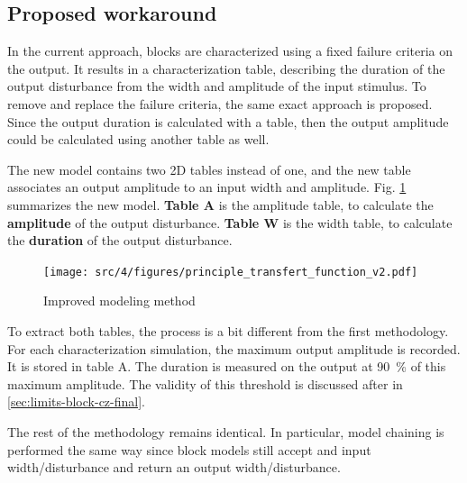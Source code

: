 \subsection{Proposed workaround}

%
In the current approach, blocks are characterized using a fixed failure criteria on the output.
It results in a characterization table, describing the duration of the output disturbance from the width and amplitude of the input stimulus.
To remove and replace the failure criteria, the same exact approach is proposed.
Since the output duration is calculated with a table, then the output amplitude could be calculated using another table as well.

The new model contains two 2D tables instead of one, and the new table associates an output amplitude to an input width and amplitude.
Fig. \ref{fig:principle-transfert-func-v2} summarizes the new model.
\textbf{Table A} is the amplitude table, to calculate the \textbf{amplitude} of the output disturbance.
\textbf{Table W} is the width table, to calculate the \textbf{duration} of the output disturbance.

\begin{figure}[!h]
  \centering
  \texttt{[image: src/4/figures/principle\_transfert\_function\_v2.pdf]}
  \caption{Improved modeling method}
  \label{fig:principle-transfert-func-v2}
\end{figure}

To extract both tables, the process is a bit different from the first methodology.
For each characterization simulation, the maximum output amplitude is recorded.
It is stored in table A.
The duration is measured on the output at \SI{90}{\percent} of this maximum amplitude.
The validity of this threshold is discussed after in \ref{sec:limits-block-cz-final}.

The rest of the methodology remains identical.
In particular, model chaining is performed the same way since block models still accept and input width/disturbance and return an output width/disturbance.



